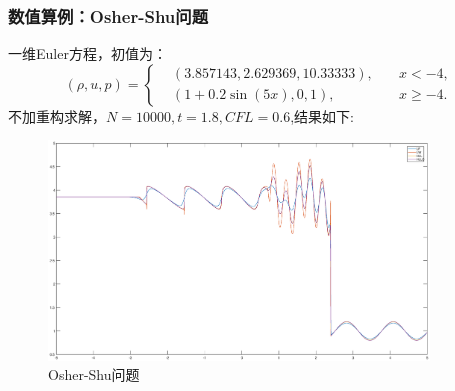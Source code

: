\documentclass[8pt,mathserif]{beamer}
\begin{document}
\begin{frame}
  \frametitle{数值算例：Osher-Shu问题}
  一维Euler方程，初值为：
  \begin{equation*}
    (\rho,u,p)=\left\{
    \begin{aligned}
      &(3.857143,2.629369,10.33333),\quad &x< -4, \\
      &(1+0.2\sin (5x),0,1),\quad &x\geq -4.
    \end{aligned}
    \right.
  \end{equation*}
不加重构求解，$N=10000,t=1.8,CFL=0.6$,结果如下:
\begin{figure}[H]
  \begin{center}
    \includegraphics[width=0.9\textwidth]{../doc/images/EulerShu-Noreconstruction.eps}
  \end{center}
  \caption{Osher-Shu问题}
\end{figure}
\end{frame}
\end{document}
